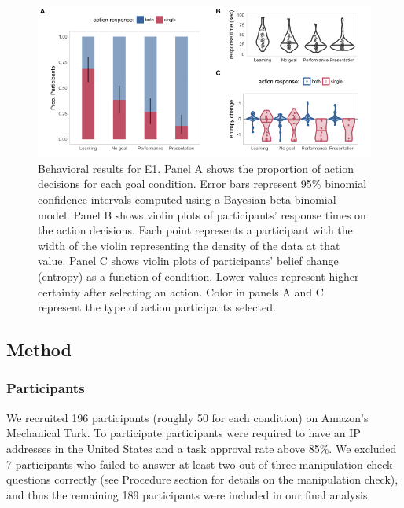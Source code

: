 \documentclass[10pt, letterpaper]{article}
\newenvironment{CodeChunk}{}{}
\begin{document}
\begin{CodeChunk}
\begin{figure}[tb]

{\centering \includegraphics[width=0.95\linewidth]{figs/e1_behav_results_plot-1} 

}

\caption[Behavioral results for E1]{Behavioral results for E1. Panel A shows the proportion of action decisions for each goal condition. Error bars represent 95\% binomial confidence intervals computed using a Bayesian beta-binomial model. Panel B shows violin plots of participants' response times on the action decisions. Each point represents a participant with the width of the violin representing the density of the data at that value. Panel C shows violin plots of participants' belief change (entropy) as a function of condition. Lower values represent higher certainty after selecting an action. Color in panels A and C represent the type of action participants selected.}\label{fig:e1_behav_results_plot}
\end{figure}
\end{CodeChunk}

\subsection{Method}\label{method}

\subsubsection{Participants}\label{participants}

We recruited 196 participants (roughly 50 for each condition) on
Amazon's Mechanical Turk. To participate participants were required to
have an IP addresses in the United States and a task approval rate above
85\%. We excluded 7 participants who failed to answer at least two out
of three manipulation check questions correctly (see Procedure section
for details on the manipulation check), and thus the remaining 189
participants were included in our final analysis.
\end{document}
